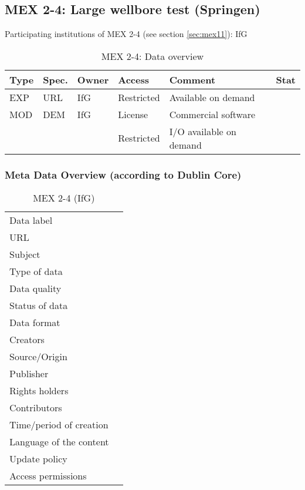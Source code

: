 \subsection{MEX 2-4: Large wellbore test (Springen)}

Participating institutions of MEX 2-4 (see section \ref{sec:mex11}): IfG

\begin{table}[ht!]
\caption{MEX 2-4: Data overview}
\label{tab:dms-mex24-overview}
\small
\begin{tabular}{l|l|l|l|L{4.7cm}|l}
\hline
{}
Type & Spec. & Owner & Access     & Comment                       & Stat \\ 
\hline 
EXP  & URL   & IfG   & Restricted & Available on demand           &  \\
\hline \hline
MOD  & DEM   & IfG   & License    & Commercial software           &  \\
     &       &       & Restricted & I/O available on demand       &  \\
\hline
\end{tabular}
\end{table}
\normalsize

\subsubsection*{Meta Data Overview (according to Dublin Core)}

\begin{table}[!ht]
\caption{MEX 2-4 (IfG)}
\label{tab:dms-mex2-4}
\small
\begin{tabular}{R{3cm}|L{7cm}}
\hline
%
Data label &  \\
URL &  \\
Subject  &  \\
Type of data  &  \\
Data quality  &  \\
Status of data  &  \\
Data format  & \\
Creators  &  \\
Source/Origin &  \\
Publisher  &  \\
Rights holders &  \\
Contributors &  \\
Time/period of creation &  \\
Language of the content &  \\
Update policy &  \\
Access permissions &  \\
%
\hline
\end{tabular}
\end{table}